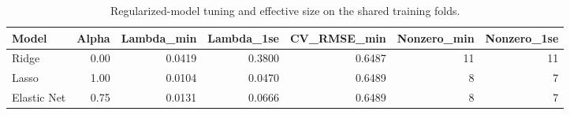 \begin{table}

\caption{\label{tab:p4-regularized-display}Regularized-model tuning and effective size on the shared training folds.}
\centering
\begin{tabular}[t]{lrrrrrr}
\toprule
Model & Alpha & Lambda\_min & Lambda\_1se & CV\_RMSE\_min & Nonzero\_min & Nonzero\_1se\\
\midrule
Ridge & 0.00 & 0.0419 & 0.3800 & 0.6487 & 11 & 11\\
Lasso & 1.00 & 0.0104 & 0.0470 & 0.6489 & 8 & 7\\
Elastic Net & 0.75 & 0.0131 & 0.0666 & 0.6489 & 8 & 7\\
\bottomrule
\end{tabular}
\end{table}

